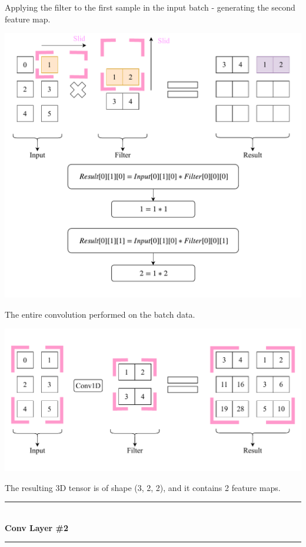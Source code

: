 \documentclass[a4paper, 12pt]{report}
\newcommand\tab[1][1cm]{\hspace*{#1}}
\begin{document}
\newpage
\begin{blockfigure}{ Applying the filter to the first sample in the input batch - generating the second feature map.}
	\begin{center}
		\includegraphics[width=\textwidth]{firstConvSample_step3}
	\end{center}
\end{blockfigure}
\begin{blockfigure}{ The entire convolution performed on the batch data.}
		\begin{center}
			\includegraphics[width=\textwidth]{firstConvSample_final}
		\end{center}
\end{blockfigure}
\tab The resulting 3D tensor is of shape (3, 2, 2), and it contains 2 feature maps.
\newpage
	{
		
		\color{blue-primary-alt} 
		\rule{2.1cm}{0.4mm}\\[0.2cm]
		\textbf{Conv Layer \#2}\\
		\rule{2.1cm}{0.4mm}
	}\\\\
\end{document}
